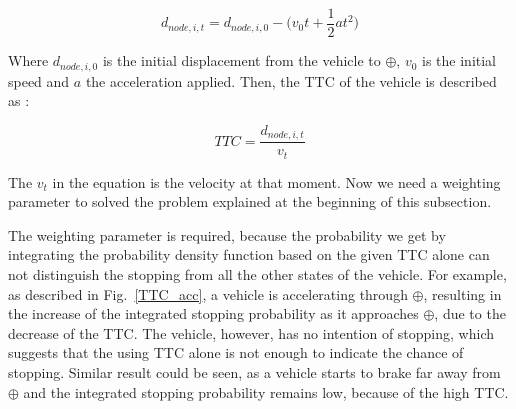 \documentclass[twocolumn,10pt]{asme2e}
\begin{document}
\begin{equation}
d_{node, i, t} = d_{node,i,0} - \biggl(v_0t+\frac{1}{2}at^2\biggr)
\label{d_node}
\end{equation}

Where $d_{node,i,0}$ is the initial displacement from the vehicle to $\oplus$, $v_0$ is the initial speed and $a$ the acceleration applied. Then, the TTC of the vehicle is described as :

\begin{equation}
TTC = \frac{d_{node,i,t}}{v_t}
\label{TTC_3}
\end{equation}

The $v_t$ in the equation is the velocity at that moment. Now we need a weighting parameter to solved the problem explained at the beginning of this subsection. 

The weighting parameter is required, because the probability we get by integrating the probability density function based on the given TTC alone can not distinguish the stopping from all the other states of the vehicle. For example, as described in Fig.~\ref{TTC_acc}, a vehicle is accelerating through $\oplus$, resulting in the increase of the integrated stopping probability as it approaches $\oplus$, due to the decrease of the TTC. The vehicle, however, has no intention of stopping, which suggests that the using TTC alone is not enough to indicate the chance of stopping. Similar result could be seen, as a vehicle starts to brake far away from $\oplus$ and the integrated stopping probability remains low, because of the high TTC.
\end{document}
